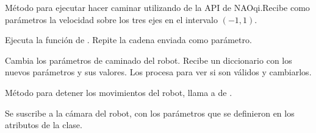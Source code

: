 
\begin{fulllineitems}
\label{\detokenize{nao_firebase:nao_robot.Robot.move_robot}}
Método para ejecutar hacer caminar utilizando  de la
API de NAOqi.Recibe como parámetros la velocidad sobre los tres
ejes en el intervalo $(-1, 1)$.

\end{fulllineitems}

\begin{fulllineitems}
\label{\detokenize{nao_firebase:nao_robot.Robot.say_speech}}
Ejecuta la función  de . Repite la cadena
enviada como parámetro.

\end{fulllineitems}


\begin{fulllineitems}
\label{\detokenize{nao_firebase:nao_robot.Robot.set_move_config}}
Cambia los parámetros de caminado del robot. Recibe un diccionario
con los nuevos parámetros y sus valores. Los procesa para ver si son válidos
y cambiarlos.

\end{fulllineitems}


\begin{fulllineitems}
\label{\detokenize{nao_firebase:nao_robot.Robot.stop_movement}}
Método para detener los movimientos del robot, llama a 
de .

\end{fulllineitems}


\begin{fulllineitems}
\label{\detokenize{nao_firebase:nao_robot.Robot.subscribe_to_camera}}
Se suscribe a la cámara del robot, con los parámetros que se definieron
en los atributos de la clase.

\end{fulllineitems}


